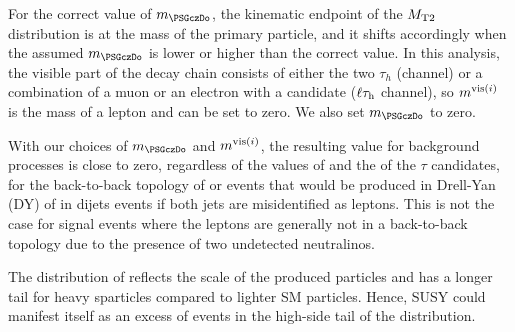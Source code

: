 For the correct value of $m_{\PSGczDo}$, the kinematic endpoint of the ${M_{\rm T2}}$ distribution is at the mass of the primary particle, and it shifts accordingly when the assumed $m_{\PSGczDo}$ is lower or higher than the correct value. In this analysis, 
the visible part of the decay chain consists of either the two $\tau_h$ (\tauTau channel)
or a combination of a muon or an electron with a \Tau candidate ($\ell\tau_{\rm h}$ channel), so $m^{{\rm vis}(i)}$ is the mass of a lepton and can be set to zero. We also set $m_{\PSGczDo}$ to zero. 

With  our choices of $m_{\PSGczDo}$ and $m^{{\rm vis}(i)}$, the resulting \mttwo value for background processes is close to zero, regardless of the values of \MPT and the \PT of 
the $\tau$ candidates, for the 
back-to-back topology of \tauTau or \leptonTau  
events that would be produced in Drell-Yan (DY) of in dijets events if both jets are misidentified as leptons. This is not the case for signal events where the leptons are generally not in a back-to-back topology due 
to the presence of two undetected neutralinos.

The distribution of \mttwo reflects the scale of the produced particles and has a longer tail for heavy sparticles
compared to lighter SM particles. Hence, SUSY 
could manifest itself
as an excess of events in the high-side tail of the \mttwo distribution.
